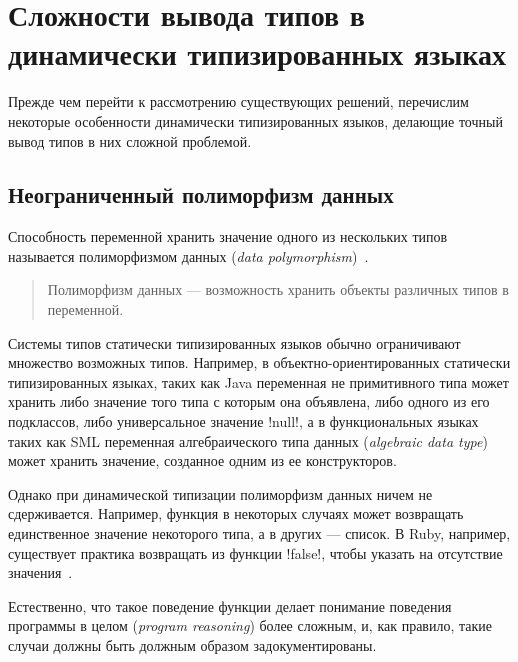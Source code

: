 
\section{Сложности вывода типов в динамически типизированных языках}
\label{sec:difficulties}

Прежде чем перейти к рассмотрению существующих решений, перечислим некоторые
особенности динамически типизированных языков, делающие точный вывод типов в них
сложной проблемой.

\subsection{Неограниченный полиморфизм данных}

Способность переменной хранить значение одного из нескольких типов называется
полиморфизмом данных (\emph{data polymorphism})~\cite{Agesen1995}. 

\begin{quote}

  Полиморфизм данных --- возможность хранить объекты различных типов в
  переменной.
\end{quote}

Системы типов статически типизированных языков обычно ограничивают множество
возможных типов.  Например, в объектно-ориентированных статически типизированных
языках, таких как Java переменная не примитивного типа может хранить либо
значение того типа с которым она объявлена, либо одного из его подклассов, либо
универсальное значение !null!, а в функциональных языках таких как SML
переменная алгебраического типа данных (\emph{algebraic data type}) может
хранить значение, созданное одним из ее конструкторов.

Однако при динамической типизации полиморфизм данных ничем не
сдерживается. Например, функция в некоторых случаях может возвращать
единственное значение некоторого типа, а в других --- список. В Ruby,
например, существует практика возвращать из функции !false!, чтобы указать на
отсутствие значения~\cite{Ren2013}. 

Естественно, что такое поведение функции делает понимание поведения программы в
целом (\emph{program reasoning}) более сложным, и, как правило, такие случаи
должны быть должным образом задокументированы. 

